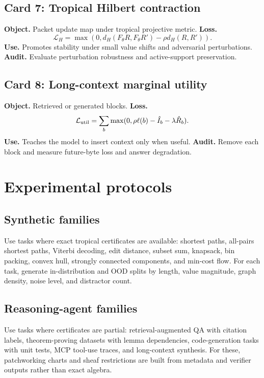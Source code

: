 \documentclass[11pt]{article}
\newcommand{\calL}{\mathcal{L}}
\begin{document}
\subsection*{Card 7: Tropical Hilbert contraction}
\textbf{Object.}  Packet update map under tropical projective metric.  \textbf{Loss.}
\begin{equation}
\calL_{H}=\max(0,d_H(F_\theta R,F_\theta R')-\rho d_H(R,R')).
\end{equation}
\textbf{Use.}  Promotes stability under small value shifts and adversarial perturbations.  \textbf{Audit.}  Evaluate perturbation robustness and active-support preservation.

\subsection*{Card 8: Long-context marginal utility}
\textbf{Object.}  Retrieved or generated blocks.  \textbf{Loss.}
\begin{equation}
\calL_{\rm util}=\sum_b\max(0,\rho\ell(b)-\hat I_b-\lambda\hat R_b).
\end{equation}
\textbf{Use.}  Teaches the model to insert context only when useful.  \textbf{Audit.}  Remove each block and measure future-byte loss and answer degradation.

\section{Experimental protocols}

\subsection{Synthetic families}

Use tasks where exact tropical certificates are available: shortest paths, all-pairs shortest paths, Viterbi decoding, edit distance, subset sum, knapsack, bin packing, convex hull, strongly connected components, and min-cost flow.  For each task, generate in-distribution and OOD splits by length, value magnitude, graph density, noise level, and distractor count.

\subsection{Reasoning-agent families}

Use tasks where certificates are partial: retrieval-augmented QA with citation labels, theorem-proving datasets with lemma dependencies, code-generation tasks with unit tests, MCP tool-use traces, and long-context synthesis.  For these, patchworking charts and sheaf restrictions are built from metadata and verifier outputs rather than exact algebra.
\end{document}

